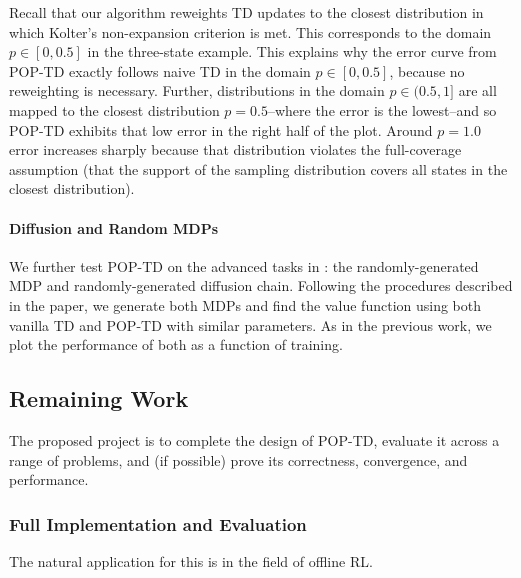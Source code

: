 \documentclass[11pt]{article}
\begin{document}
Recall that our algorithm reweights TD updates to the closest distribution in which Kolter's non-expansion criterion is met. This corresponds to the domain $p\in[0, 0.5]$ in the three-state example. This explains why the error curve from POP-TD exactly follows naive TD in the domain $p\in[0, 0.5]$, because no reweighting is necessary. Further, distributions in the domain $p\in(0.5, 1]$ are all mapped to the closest distribution $p=0.5$--where the error is the lowest--and so POP-TD exhibits that low error in the right half of the plot. Around $p=1.0$ error increases sharply because that distribution violates the full-coverage assumption (that the support of the sampling distribution covers all states in the closest distribution).

\paragraph{Diffusion and Random MDPs} We further test POP-TD on the advanced tasks in \cite{kolter2011fixed}: the randomly-generated MDP and randomly-generated diffusion chain. Following the procedures described in the paper, we generate both MDPs and find the value function using both vanilla TD and POP-TD with similar parameters. As in the previous work, we plot the performance of both as a function of training.




\subsection{Remaining Work }

The proposed project is to complete the design of POP-TD, evaluate it across a range of problems, and (if possible) prove its correctness, convergence, and performance.

\subsubsection{Full Implementation and Evaluation }

The natural application for this is in the field of offline RL.
\end{document}
